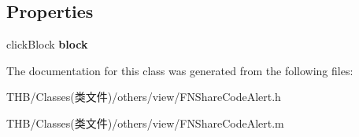 \subsection*{Properties}
\begin{DoxyCompactItemize}
\item 
\mbox{\label{interface_f_n_share_code_alert_ab6470bb62c529c73669d41e421d1f920}} 
click\+Block {\bfseries block}
\end{DoxyCompactItemize}


The documentation for this class was generated from the following files\+:\begin{DoxyCompactItemize}
\item 
T\+H\+B/\+Classes(类文件)/others/view/F\+N\+Share\+Code\+Alert.\+h\item 
T\+H\+B/\+Classes(类文件)/others/view/F\+N\+Share\+Code\+Alert.\+m\end{DoxyCompactItemize}
